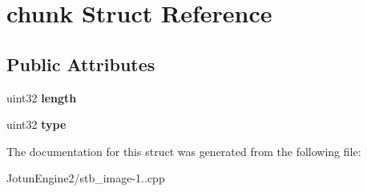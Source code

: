 \hypertarget{structchunk}{\section{chunk Struct Reference}
\label{structchunk}
}
\subsection*{Public Attributes}
\begin{DoxyCompactItemize}
\item 
\hypertarget{structchunk_a0b5cc0c5a9b91945c42373db2a499fb1}{uint32 {\bfseries length}}\label{structchunk_a0b5cc0c5a9b91945c42373db2a499fb1}

\item 
\hypertarget{structchunk_a05d5489f3807bc7ba149c1904241d087}{uint32 {\bfseries type}}\label{structchunk_a05d5489f3807bc7ba149c1904241d087}

\end{DoxyCompactItemize}


The documentation for this struct was generated from the following file\-:\begin{DoxyCompactItemize}
\item 
Jotun\-Engine2/stb\-\_\-image-\/1..\-cpp\end{DoxyCompactItemize}
